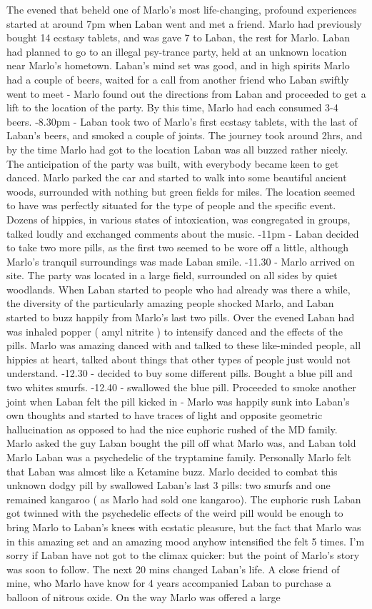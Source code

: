 \documentclass[12pt]{book}
\begin{document}
The evened that beheld one of Marlo's most life-changing, profound experiences started at around 7pm when Laban went and met a friend. Marlo had previously bought 14 ecstasy tablets, and was gave 7 to Laban, the rest for Marlo. Laban had planned to go to an illegal psy-trance party, held at an unknown location near Marlo's hometown. Laban's mind set was good, and in high spirits Marlo had a couple of beers, waited for a call from another friend who Laban swiftly went to meet - Marlo found out the directions from Laban and proceeded to get a lift to the location of the party. By this time, Marlo had each consumed 3-4 beers. -8.30pm - Laban took two of Marlo's first ecstasy tablets, with the last of Laban's beers, and smoked a couple of joints. The journey took around 2hrs, and by the time Marlo had got to the location Laban was all buzzed rather nicely. The anticipation of the party was built, with everybody became keen to get danced. Marlo parked the car and started to walk into some beautiful ancient woods, surrounded with nothing but green fields for miles. The location seemed to have was perfectly situated for the type of people and the specific event. Dozens of hippies, in various states of intoxication, was congregated in groups, talked loudly and exchanged comments about the music. -11pm - Laban decided to take two more pills, as the first two seemed to be wore off a little, although Marlo's tranquil surroundings was made Laban smile. -11.30 - Marlo arrived on site. The party was located in a large field, surrounded on all sides by quiet woodlands. When Laban started to people who had already was there a while, the diversity of the particularly amazing people shocked Marlo, and Laban started to buzz happily from Marlo's last two pills. Over the evened Laban had was inhaled popper ( amyl nitrite ) to intensify danced and the effects of the pills. Marlo was amazing danced with and talked to these like-minded people, all hippies at heart, talked about things that other types of people just would not understand. -12.30 - decided to buy some different pills. Bought a blue pill and two whites smurfs. -12.40 - swallowed the blue pill. Proceeded to smoke another joint when Laban felt the pill kicked in - Marlo was happily sunk into Laban's own thoughts and started to have traces of light and opposite geometric hallucination as opposed to had the nice euphoric rushed of the MD family. Marlo asked the guy Laban bought the pill off what Marlo was, and Laban told Marlo Laban was a psychedelic of the tryptamine family. Personally Marlo felt that Laban was almost like a Ketamine buzz. Marlo decided to combat this unknown dodgy pill by swallowed Laban's last 3 pills: two smurfs and one remained kangaroo ( as Marlo had sold one kangaroo). The euphoric rush Laban got twinned with the psychedelic effects of the weird pill would be enough to bring Marlo to Laban's knees with ecstatic pleasure, but the fact that Marlo was in this amazing set and an amazing mood anyhow intensified the felt 5 times. I'm sorry if Laban have not got to the climax quicker: but the point of Marlo's story was soon to follow. The next 20 mins changed Laban's life. A close friend of mine, who Marlo have know for 4 years accompanied Laban to purchase a balloon of nitrous oxide. On the way Marlo was offered a large 
\end{document}
